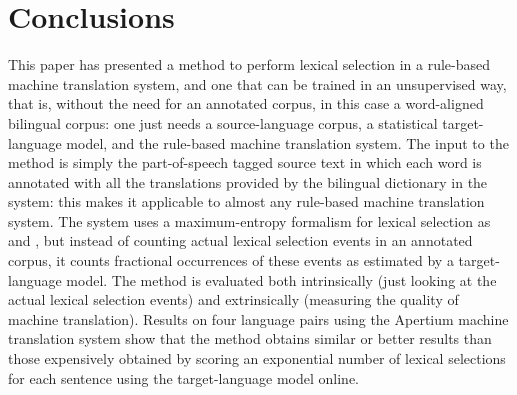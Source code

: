 \documentclass[11pt]{article}
\newcommand{\comment}[1]{\todo{#1}}
\begin{document}



\section{Conclusions}

\comment{First try at a set of conclusions by Mikel} This paper has
presented a method to perform lexical selection in a rule-based
machine translation system, and one that can be trained in an
unsupervised way, that is, without the need for an annotated corpus,
in this case a word-aligned bilingual corpus: one just needs a
source-language corpus, a statistical target-language model, and the
rule-based machine translation system. The input to the method is
simply the part-of-speech tagged source text in which each word is
annotated with all the translations provided by the bilingual
dictionary in the system: this makes it applicable to almost any
rule-based machine translation system. The system uses a
maximum-entropy formalism for lexical selection as \cite{berger1996}
and \cite{marechek10}, but instead of counting actual lexical
selection events in an annotated corpus, it counts fractional
occurrences of these events as estimated by a target-language
model. The method is evaluated both intrinsically (just looking at the
actual lexical selection events) and extrinsically (measuring the
quality of machine translation). Results on four language pairs using
the Apertium \citep{forcada2011apertium} machine translation system
show that the method obtains similar or better results than those
expensively obtained by scoring an exponential number of lexical
selections for each sentence using the target-language model online.

\end{document}
